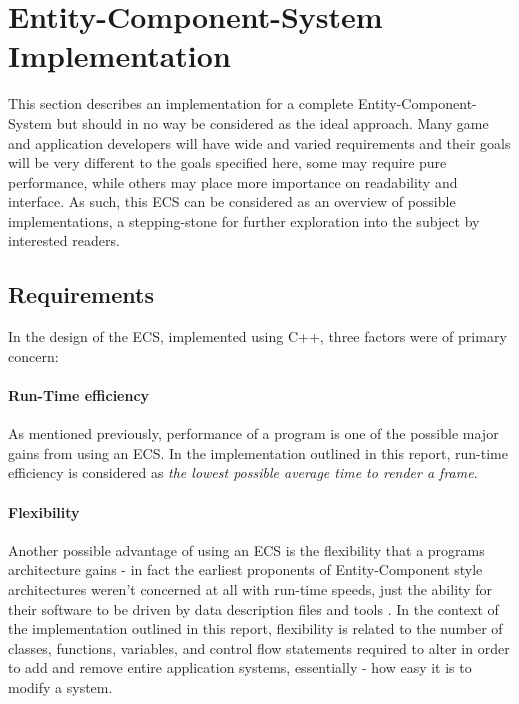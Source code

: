 \documentclass[10pt]{scrartcl}
\begin{document}


	\section{Entity-Component-System Implementation} %
	\label{sec:entity_component_system_implementation}

	This section describes an implementation for a complete Entity-Component-System but should in no way be considered as the ideal approach. Many game and application developers will have wide and varied requirements and their goals will be very different to the goals specified here, some may require pure performance, while others may place more importance on readability and interface. As such, this ECS can be considered as an overview of possible implementations, a stepping-stone for further exploration into the subject by interested readers.
	
	\subsection{Requirements} %
	\label{sub:requirements}
	In the design of the ECS, implemented using C++, three factors were of primary concern:

	\paragraph{Run-Time efficiency} %
	\label{par:run_time_efficiency}

	As mentioned previously, performance of a program is one of the possible major gains from using an ECS. In the implementation outlined in this report, run-time efficiency is considered as \textit{the lowest possible average time to render a frame}.
	

	\paragraph{Flexibility} %
	\label{par:flexibility}
	
	Another possible advantage of using an ECS is the flexibility that a programs architecture gains - in fact the earliest proponents of Entity-Component style architectures weren't concerned at all with run-time speeds, just the ability for their software to be driven by data description files and tools \parencite{bilas}. In the context of the implementation outlined in this report, flexibility is related to the number of classes, functions, variables, and control flow statements required to alter in order to add and remove entire application systems, essentially - how easy it is to modify a system.
	
\end{document}
